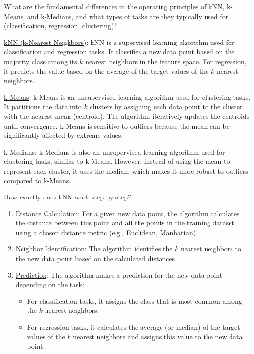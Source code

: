 \begin{ejercicio}
    What are the fundamental differences in the operating principles of kNN, k-Means, and k-Medians, and what types of tasks are they typically used for (classification, regression, clustering)?
    \begin{description}
        \item \ul{kNN (k-Nearest Neighbors)}: kNN is a supervised learning algorithm used for classification and regression tasks. It classifies a new data point based on the majority class among its $k$ nearest neighbors in the feature space. For regression, it predicts the value based on the average of the target values of the $k$ nearest neighbors.

        \item \ul{k-Means}: k-Means is an unsupervised learning algorithm used for clustering tasks. It partitions the data into $k$ clusters by assigning each data point to the cluster with the nearest mean (centroid). The algorithm iteratively updates the centroids until convergence. k-Means is sensitive to outliers because the mean can be significantly affected by extreme values.

        \item \ul{k-Medians}: k-Medians is also an unsupervised learning algorithm used for clustering tasks, similar to k-Means. However, instead of using the mean to represent each cluster, it uses the median, which makes it more robust to outliers compared to k-Means.
    \end{description}
\end{ejercicio}
\begin{ejercicio}
    How exactly does kNN work step by step?
    \begin{enumerate}
        \item \ul{Distance Calculation}: For a given new data point, the algorithm calculates the distance between this point and all the points in the training dataset using a chosen distance metric (e.g., Euclidean, Manhattan).
        \item \ul{Neighbor Identification}: The algorithm identifies the $k$ nearest neighbors to the new data point based on the calculated distances.
        \item \ul{Prediction}: The algorithm makes a prediction for the new data point depending on the task:
        \begin{itemize}
            \item For classification tasks, it assigns the class that is most common among the $k$ nearest neighbors.
            \item For regression tasks, it calculates the average (or median) of the target values of the $k$ nearest neighbors and assigns this value to the new data point.
        \end{itemize}
    \end{enumerate}
\end{ejercicio}
